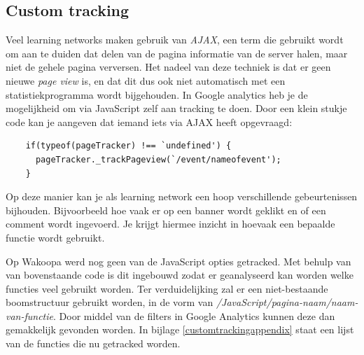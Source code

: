 \documentclass[a4paper, 10pt, pdftex]{report}
\begin{document}
    \subsection{Custom tracking}
    Veel learning networks maken gebruik van \emph{AJAX}, een term die gebruikt wordt om aan te duiden dat delen van de pagina informatie van de server halen, maar niet de gehele pagina verversen. Het nadeel van deze techniek is dat er geen nieuwe \emph{page view} is, en dat dit dus ook niet automatisch met een statistiekprogramma wordt bijgehouden. In Google analytics heb je de mogelijkheid om via JavaScript zelf aan tracking te doen. Door een klein stukje code kan je aangeven dat iemand iets via AJAX heeft opgevraagd:
    \begin{verbatim}
    if(typeof(pageTracker) !== `undefined') {
      pageTracker._trackPageview(`/event/nameofevent');
    }
    \end{verbatim}
    Op deze manier kan je als learning network een hoop verschillende gebeurtenissen bijhouden. Bijvoorbeeld hoe vaak er op een banner wordt geklikt en of een comment wordt ingevoerd. Je krijgt hiermee inzicht in hoevaak een bepaalde functie wordt gebruikt.

    Op Wakoopa werd nog geen van de JavaScript opties getracked. Met behulp van van bovenstaande code is dit ingebouwd zodat er geanalyseerd kan worden welke functies veel gebruikt worden. Ter verduidelijking zal er een niet-bestaande boomstructuur gebruikt worden, in de vorm van \emph{/JavaScript/pagina-naam/naam-van-functie}. Door middel van de filters in Google Analytics kunnen deze dan gemakkelijk gevonden worden. In bijlage \ref{customtrackingappendix} staat een lijst van de functies die nu getracked worden.
\end{document}
